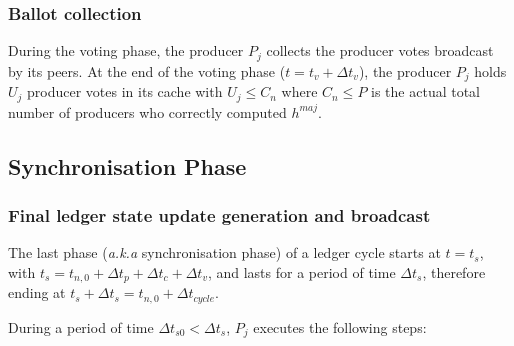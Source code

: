 \documentclass{article}
\begin{document}
\subsubsection{Ballot collection}
During the voting phase, the producer $P_j$ collects the producer votes broadcast by its peers. At the end of the voting phase ($t = t_v+\Delta t_{v}$), the producer $P_j$ holds $U_j$ producer votes in its cache with $U_j \leq C_n$ where $C_n \leq P$ is the actual total number of producers who correctly computed $h^{maj}$.

\subsection{Synchronisation Phase}

\subsubsection{Final ledger state update generation and broadcast}

The last phase (\textit{a.k.a} synchronisation phase) of a ledger cycle starts at $t = t_s$, with $t_s = t_{n,0} + \Delta t_{p} + \Delta t_{c}+ \Delta t_{v}$, and lasts for a period of time $\Delta t_{s}$, therefore ending at $t_s+\Delta t_s = t_{n,0} + \Delta t_{cycle}$.

During a period of time $\Delta t_{s0} < \Delta t_{s}$, $P_j$ executes the following steps:
\end{document}
